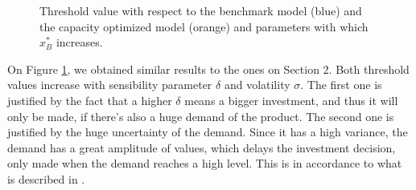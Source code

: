 \begin{figure}[!htb]
	\begin{subfigmatrix}{2}
	\end{subfigmatrix}
	\caption{Threshold value with respect to the benchmark model (blue) and the capacity optimized model (orange) and parameters with which $x^*_B$ increases.}
	\label{fig:2_x2}
\end{figure}

On Figure \ref{fig:2_x2}, we obtained similar results to the ones on Section 2. Both threshold values increase with sensibility parameter $\delta$ and volatility $\sigma$. The first one is justified by the fact that a higher $\delta$ means a bigger investment, and thus it will only be made, if there's also a huge demand of the product. The second one is justified by the huge uncertainty of the demand. Since it has a high variance, the demand has a great amplitude of values, which delays the investment decision, only made when the demand reaches a high level. This is in accordance to what is described in \cite{dixit:book}.



